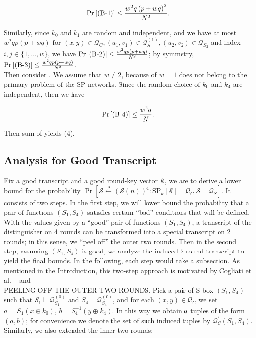 $$
\operatorname{Pr}\left[\text{(B-1)}\right] \leq \frac{w^{2} q \left(p+w q\right)^{2}}{N^{2}}.
$$

Similarly, since $k_{0}$ and $k_{1}$ are random and independent, and we have at most $w^{2} q p \left(p+w q\right)$ for $(x, y) \in \mathcal{Q}_{C}, \left(u_{1}, v_{1}\right) \in \mathcal{Q}_{S_{1}}^{(1)}, \left(u_{2}, v_{2}\right) \in \mathcal{Q}_{S_{2}}$ and index $i, j \in \{1, \ldots, w\}$, we have $\operatorname{Pr}\left[\text{(B-2)}\right] \leq \frac{w^{2} q p \left(p+w q\right)}{N^{2}}$; by symmetry, $\operatorname{Pr}\left[\text{(B-3)}\right] \leq \frac{w^{2} q p \left(p+w q\right)}{N^{2}}$. \\

\noindent Then consider \bfour. We assume that $w \neq 2$, because of $w = 1$ does not belong to the primary problem of the SP-networks. Since the random choice of $k_{0}$ and $k_{4}$ are independent, then we have

$$
\operatorname{Pr}\left[\text{(B-4)}\right] \leq \frac{w^{2} q}{N}.
$$

\noindent  Then sum of yields (4).

\subsection{Analysis for Good Transcript}

\noindent Fix a good transcript and a good round-key vector $\mathnormal{k}$, we are to derive a lower bound for the probability  $\operatorname{Pr}\left[\mathcal{S} \stackrel{\mathbf{s}}{\leftarrow}(\mathcal{S}(n))^{4}: \mathrm{SP}_{k}[\mathcal{S}] \vdash \mathcal{Q}_{C} | \mathcal{S} \vdash \mathcal{Q}_{S}\right]$. It consists of two steps. In the first step, we will lower bound the probability that a pair of functions $(S_{1}, S_{4})$  satisfies certain ``bad'' conditions that will be defined. With the values given by a ``good'' pair of functions $(S_{1}, S_{4})$, a transcript of the distinguisher on 4 rounds can be transformed into a special transcript on 2 rounds; in this sense, we ``peel off'' the outer two rounds. Then in the second step, assuming $(S_{1}, S_{4})$ is good, we analyze the induced 2-round transcript to yield the final bounds. In the following, each step would take a subsection. As mentioned in the Introduction, this two-step approach is motivated by Cogliati et al.
~\cite{cogliati2015tweaking} and ~\cite{cogliati2015beyond}.\\

\noindent
\textsc{PEELING OFF THE OUTER TWO ROUNDS}. Pick a pair of S-box $(S_1, S_4)$ such that $S_{1} \vdash \mathcal{Q}_{S_{1}}^{(0)}$ and $S_{4} \vdash \mathcal{Q}_{S_{4}}^{(0)}$, and for each $ (x, y) \in \mathcal{Q}_{C}$ we set $a=S_{1}\left(x \oplus k_{0}\right)$, $b=S_{4}^{-1}\left(y \oplus k_{4}\right)$. In this way we obtain $\mathnormal{q}$ tuples of the form $(a,b)$; for convenience we denote the set of such induced tuples by $\mathcal{Q}_{C}^{*}\left(S_{1}, S_{4}\right)$. Similarly, we also extended the inner two rounds:\\

